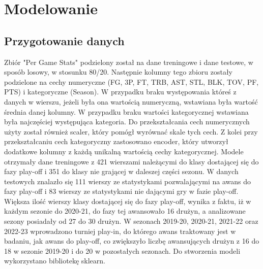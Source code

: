 \documentclass{article}
\begin{document}
\section{Modelowanie}

    \subsection{Przygotowanie danych}

    Zbiór "Per Game Stats" podzielony został na dane treningowe i dane testowe, w sposób losowy, w stosunku 80/20. Następnie kolumny tego zbioru zostały podzielone na cechy numeryczne (FG, 3P, FT, TRB, AST, STL, BLK, TOV, PF, PTS) i kategoryczne (Season). W przypadku braku występowania któreś z danych w wierszu, jeżeli była ona wartością numeryczną, wstawiana była wartość średnia danej kolumny. W przypadku braku wartości kategorycznej wstawiana była najczęściej występująca kategoria. Do przekształcania cech numerycznych użyty został również scaler, który pomógł wyrównać skale tych cech. Z kolei przy przekształcaniu cech kategoryczny zastosowano encoder, który utworzył dodatkowe kolumny z każdą unikalną wartością cechy kategorycznej. 
    Modele otrzymały dane treningowe z 421 wierszami należącymi do klasy dostającej się do fazy play-off i 351 do klasy nie grającej w daleszej części sezonu. W danych testowych znalazło się 111 wierszy ze statystykami pozwalającymi na awans do fazy play-off i 83 wierszy ze statystykami nie dającymi gry w fazie play-off. Większa ilość wierszy klasy dostającej się do fazy play-off, wynika z faktu, iż w każdym sezonie do 2020-21, do fazy tej awansowało 16 drużyn, a analizowane sezony posiadały od 27 do 30 drużyn. W sezonach 2019-20, 2020-21, 2021-22 oraz 2022-23 wprowadzono turniej play-in, do którego awans traktowany jest w badaniu, jak awans do play-off, co zwiększyło liczbę awansujących drużyn z 16 do 18 w sezonie 2019-20 i do 20 w pozostałych sezonach.
    Do stworzenia modeli wykorzystano bibliotekę sklearn.
\end{document}
